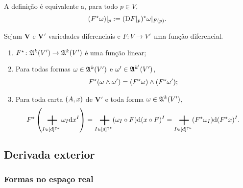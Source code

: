 A definição  é equivalente a, para todo $p \in V$,
	\begin{equation*}
	(F^\star \omega)|_p := (\mathrm{D} F|_p)^\star \omega|_{F(p)}.
	\end{equation*}

\begin{proposition}
Sejam $\bm V$ e $\bm V'$ variedades diferenciais e $F\colon V \to V'$ uma função diferencial.
	\begin{enumerate}
	\item $F^\star\colon \mathfrak{A}^k (V') \to \mathfrak{A}^k(V')$ é uma função linear;
	\item Para todas formas $\omega \in \mathfrak{A}^k(V')$ e $\omega' \in \mathfrak{A}^{k'} (V')$,
		\begin{equation*}
		F^\star(\omega \wedge \omega') = (F^\star\omega) \wedge (F^\star\omega');
		\end{equation*}
	\item Para toda carta $(A,x)$ de $\bm V'$ e toda forma $\omega \in \mathfrak{A}^k (V')$,
		\begin{equation*}
		F\pux \left( \sum_{I \in [d]^{\uparrow k}} \omega_I \dd\x^{I}\right) = \sum_{I \in [d]^{\uparrow k}} (\omega_I \circ F) \dd(\x \circ F)^{I} = \sum_{I \in [d]^{\uparrow k}} (F\pux\omega_I) \dd(F\pux\x)^{I}.
		\end{equation*}
	\end{enumerate}
\end{proposition}

\subsection{Derivada exterior}

\subsubsection{Formas no espaço real}

